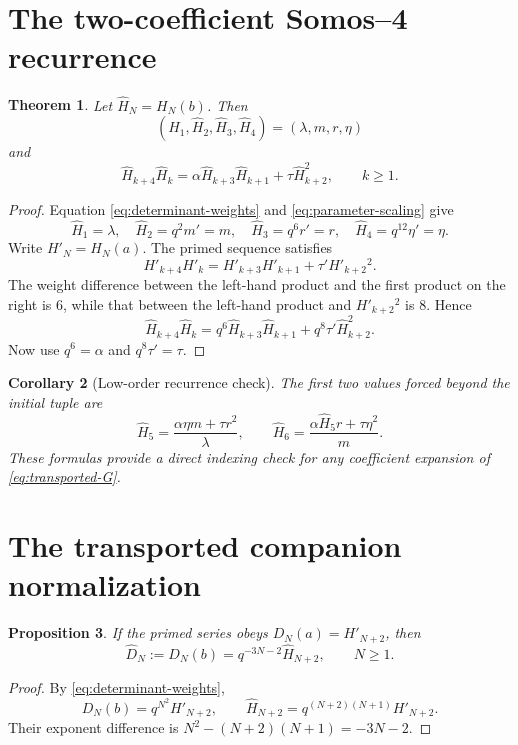 \documentclass[11pt]{article}
\newtheorem{theorem}{Theorem}
\newtheorem{proposition}[theorem]{Proposition}
\newtheorem{corollary}[theorem]{Corollary}
\theoremstyle{definition}
\theoremstyle{remark}
\newcommand{\Ha}{\widehat H}
\newcommand{\Da}{\widehat D}
\begin{document}
\section{The two-coefficient Somos--4 recurrence}
\begin{theorem}
Let $\Ha_N=H_N(b)$.  Then
\[
 (\Ha_1,\Ha_2,\Ha_3,\Ha_4)=(\lambda,m,r,\eta)
\]
and
\begin{equation}
 \Ha_{k+4}\Ha_k
 =\alpha\Ha_{k+3}\Ha_{k+1}+\tau\Ha_{k+2}^2,
 \qquad k\geq1.
 \label{eq:transported-recurrence}
\end{equation}
\end{theorem}
\begin{proof}
Equation \eqref{eq:determinant-weights} and
\eqref{eq:parameter-scaling} give
\[
 \Ha_1=\lambda,
 \quad \Ha_2=q^2m'=m,
 \quad \Ha_3=q^6r'=r,
 \quad \Ha_4=q^{12}\eta'=\eta.
\]
Write $H'_N=H_N(a)$.  The primed sequence satisfies
\[
 H'_{k+4}H'_k=H'_{k+3}H'_{k+1}+\tau'H'_{k+2}{}^2.
\]
The weight difference between the left-hand product and the first product on
the right is $6$, while that between the left-hand product and
$H'_{k+2}{}^2$ is $8$.  Hence
\[
 \Ha_{k+4}\Ha_k
 =q^6\Ha_{k+3}\Ha_{k+1}+q^8\tau'\Ha_{k+2}^2.
\]
Now use $q^6=\alpha$ and $q^8\tau'=\tau$.
\end{proof}

\begin{corollary}[Low-order recurrence check]
The first two values forced beyond the initial tuple are
\[
 \Ha_5=\frac{\alpha\eta m+\tau r^2}{\lambda},
\qquad
 \Ha_6=\frac{\alpha\Ha_5r+\tau\eta^2}{m}.
\]
These formulas provide a direct indexing check for any coefficient expansion
of \eqref{eq:transported-G}.
\end{corollary}

\section{The transported companion normalization}
\begin{proposition}
If the primed series obeys $D_N(a)=H'_{N+2}$, then
\begin{equation}
 \Da_N:=D_N(b)=q^{-3N-2}\Ha_{N+2},
 \qquad N\geq1.
 \label{eq:graded-companion}
\end{equation}
\end{proposition}
\begin{proof}
By \eqref{eq:determinant-weights},
\[
 D_N(b)=q^{N^2}H'_{N+2},\qquad
 \Ha_{N+2}=q^{(N+2)(N+1)}H'_{N+2}.
\]
Their exponent difference is
$N^2-(N+2)(N+1)=-3N-2$.
\end{proof}
\end{document}
